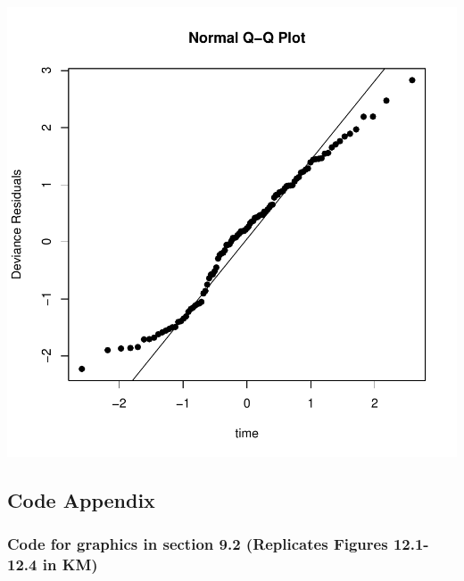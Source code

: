 \documentclass[10pt]{article}\usepackage[]{graphicx}\usepackage[]{xcolor}
\makeatletter
\def\maxwidth{ %
  \ifdim\Gin@nat@width>\linewidth
    \linewidth
  \else
    \Gin@nat@width
  \fi
}
\newenvironment{knitrout}{}{} %
\theoremstyle{definition}
\numberwithin{equation}{subsection}
\numberwithin{figure}{section}
\numberwithin{table}{subsection}
\numberwithin{Report}{section}
\numberwithin{Example}{subsection}
\makeatother
\begin{document}
\begin{knitrout}
\color{fgcolor}

{\centering \includegraphics[width=\maxwidth]{figure/unnamed-chunk-4-1} 

}


\end{knitrout}

\subsection{Code Appendix}
\subsubsection{Code for graphics in section 9.2 (Replicates Figures 12.1-12.4 in KM)}
\end{document}
